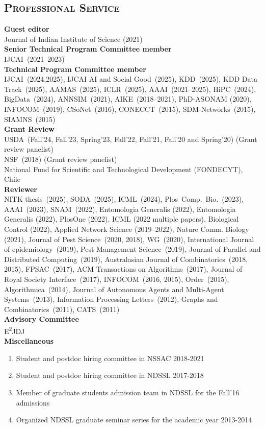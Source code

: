 \documentclass[margin,10pt]{res} %
\begin{document}
\begin{resume}
\section{\textnormal{\textsc{Professional Service}}}
\noindent\textbf{Guest editor}\\
Journal of Indian Institute of Science (2021)
\smallskip\\
\noindent\textbf{Senior Technical Program Committee member}\\ 
IJCAI~(2021--2023)
\smallskip\\
\noindent\textbf{Technical Program Committee member}\\ 
IJCAI~(2024,2025), IJCAI AI and Social Good~(2025), KDD~(2025), KDD Data
Track~(2025), AAMAS~(2025), ICLR~(2025), AAAI~(2021--2025), HiPC~(2024),
BigData~(2024), ANNSIM~(2021), AIKE~(2018--2021), PhD-ASONAM (2020),
INFOCOM~(2019), CSoNet~(2016), CONECCT~(2015), SDM-Networks~(2015),
SIAMNS~(2015)\smallskip\\
\noindent\textbf{Grant Review}\\
USDA~(Fall'24, Fall'23, Spring'23, Fall'22, Fall'21, Fall'20 and Spring'20) (Grant review panelist)\\
NSF~(2018) (Grant review panelist)\\
National Fund for Scientific and Technological Development (FONDECYT),
Chile\smallskip\\
\noindent\textbf{Reviewer}\\ 
\noindent
NITK thesis~(2025),
SODA~(2025),
ICML~(2024),
Plos~Comp.~Bio.~(2023),
AAAI~(2023),
SNAM~(2022),
Entomologia Generalis (2022),
Entomologia Generalis (2022),
PlosOne (2022),
ICML (2022 multiple papers),
Biological Control (2022),
Applied Network Science (2019--2022),
Nature Comm. Biology (2021),
Journal of Pest Science~(2020, 2018), 
WG~(2020),
International Journal of epidemiology~(2019),
Pest Management Science~(2019), 
Journal of Parallel and Distributed Computing~(2019), 
Australasian Journal of Combinatorics~(2018, 2015),
FPSAC~(2017),
ACM Transactions on Algorithms~(2017),
Journal of Royal Society Interface~(2017), INFOCOM~(2016, 2015), Order~(2015), 
Algorithmica~(2014), Journal of Autonomous Agents and Multi-Agent
Systems~(2013), 
Information Processing Letters~(2012), 
Graphs and
Combinatorics~(2011), CATS~(2011)\smallskip\\
\noindent\textbf{Advisory Committee}\\
E\textsuperscript{2}JDJ\bigskip\\
\noindent\textbf{Miscellaneous}\\ 
\begin{enumerate}[$\circ$]
\item Student and postdoc hiring committee in NSSAC 2018-2021
\item Student and postdoc hiring committee in NDSSL 2017-2018
\item Member of graduate students admission team in NDSSL for the Fall'16
admissions
\item Organized NDSSL graduate seminar series for the academic year 2013-2014
\end{enumerate}
\end{resume}

\end{document}

